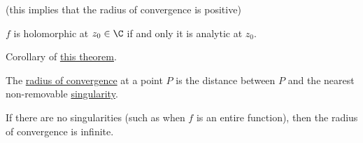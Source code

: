 (this implies that the radius of convergence is positive)

\label{c1a4a81}

$f$ is holomorphic at $z_0\in\C$ if and only it is analytic at $z_0$.

\label{ddc574e}

Corollary of \href{c1a4a81}{this theorem}.

The \href{da6e337}{radius of convergence} at a point $P$ is the distance
between $P$ and the nearest non-removable \href{a7f062e}{singularity}.

If there are no singularities (such as when $f$ is an entire function), then
the radius of convergence is infinite.
